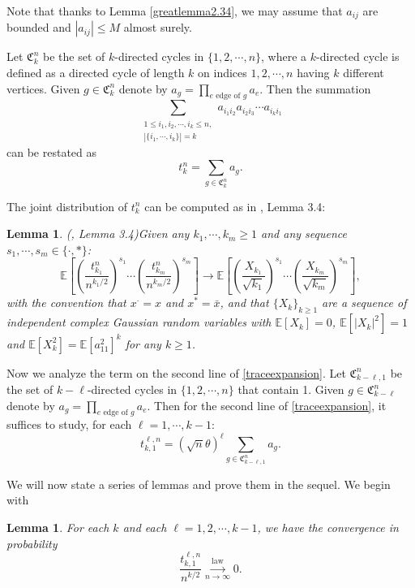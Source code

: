 \documentclass[12pt, reqno]{amsart}
\newtheorem{lemma}[theorem]{Lemma}
\theoremstyle{definition}
\theoremstyle{remark}
\numberwithin{equation}{section}
\begin{document}
Note that thanks to Lemma \ref{greatlemma2.34}, we may assume that $a_{ij}$ are bounded and $|a_{ij}|\leq M$ almost surely.

Let $\mathfrak{C}_k^n$ be the set of $k$-directed cycles in $\{1,2,\cdots,n\}$, where a $k$-directed cycle is defined as a directed cycle of length $k$ on indices $1,2,\cdots,n$ having $k$ different vertices. Given $g\in \mathfrak{C}_k^n$ denote by $a_g=\prod_{e \text{ edge of }g} a_e$. Then the summation
$$
\sum_{\substack{1\leq i_1,i_2,\cdots, i_k\leq n,\\|\{i_1,\cdots,i_k\}|=k}}a_{i_1i_2}a_{i_2i_3}\cdots a_{i_ki_1}
$$
can be restated as
$$
t_k^n=\sum_{g\in\mathfrak{C}_k^n} a_g.
$$

The joint distribution of $t_k^n$ can be computed as in \cite{bordenave2021convergence}, Lemma 3.4:

\begin{lemma}(\cite{bordenave2021convergence}, Lemma 3.4)\label{fugagqgq}
    Given any $k_1,\cdots,k_m\geq 1$ and any sequence $s_1,\cdots,s_m\in\{\cdot,*\}$:
    \begin{equation}
        \mathbb{E}\left[\left(\frac{t_{k_1}^n}{n^{k_1/2}}\right)^{s_1}\cdots \left(\frac{t_{k_m}^n}{n^{k_m/2}}\right)^{s_m}
        \right]\to \mathbb{E}\left[\left(\frac{X_{k_1}}{\sqrt{k_1}}\right)^{s_1}\cdots\left(\frac{X_{k_m}}{\sqrt{k_m}}\right)^{s_m}
        \right],
    \end{equation} with the convention that $x^\cdot=x$ and $x^*=\bar{x}$,
    and that $\{X_k\}_{k\geq 1}$ are a sequence of independent complex Gaussian random variables with $\mathbb{E}[X_k]=0$, $
    \mathbb{E}[|X_k|^2]=1$ and $\mathbb{E}[X_k^2]=\mathbb{E}[a_{11}^2]^k$ for any $k\geq 1$.
\end{lemma}

Now we analyze the term on the second line of \eqref{traceexpansion}. Let $\mathfrak{C}_{k-\ell,1}^n$ be the set of $k-\ell$-directed cycles in $\{1,2,\cdots,n\}$ that contain 1. Given $g\in \mathfrak{C}_{k-\ell}^n$ denote by $a_g=\prod_{e \text{ edge of }g} a_e$. Then for the second line of \eqref{traceexpansion}, it suffices to study, for each $\ell=1,\cdots,k-1$: 
$$
t_{k,1}^{\ell,n}=(\sqrt{n}\theta)^\ell \sum_{g\in\mathfrak{C}_{k-\ell,1}^n} a_g.
$$

We will now state a series of lemmas and prove them in the sequel. We begin with

\begin{lemma}\label{lemmas2.4!}
    For each $k$ and each $\ell=1,2,\cdots,k-1$, we have the convergence in probability
    \begin{equation}
        \frac{t_{k,1}^{\ell,n}}{n^{k/2}}\overset{\text{law}}{\underset{n\to\infty}{\longrightarrow}} 0.
    \end{equation}
\end{lemma}
\end{document}
